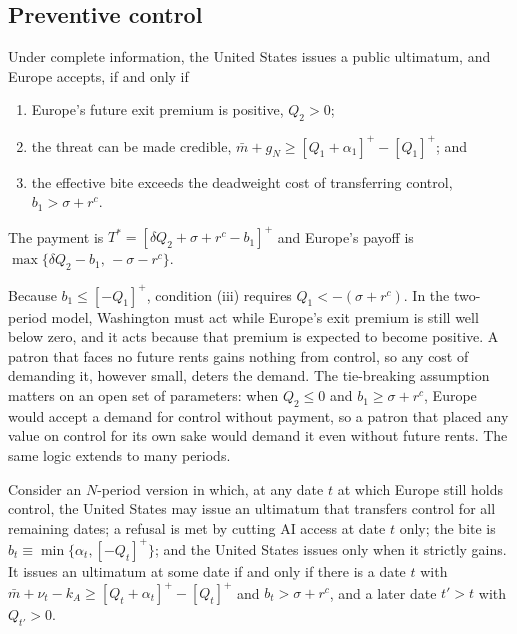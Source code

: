 \subsection{Preventive control}

\begin{proposition}\label{prop:control}
Under complete information, the United States issues a public ultimatum, and Europe accepts, if and only if
\begin{enumerate}[label=(\roman*)]
\item Europe's future exit premium is positive, $Q_2>0$;
\item the threat can be made credible, $\bar m + g_N \geq [Q_1+\alpha_1]^+ - [Q_1]^+$; and
\item the effective bite exceeds the deadweight cost of transferring control, $b_1 > \sigma + r^c$.
\end{enumerate}
The payment is $T^* = [\delta Q_2 + \sigma + r^c - b_1]^+$ and Europe's payoff is $\max\{\delta Q_2 - b_1,\, -\sigma - r^c\}$.
\end{proposition}

Because $b_1 \leq [-Q_1]^+$, condition (iii) requires $Q_1 < -(\sigma + r^c)$. In the two-period model, Washington must act while Europe's exit premium is still well below zero, and it acts because that premium is expected to become positive. A patron that faces no future rents gains nothing from control, so any cost of demanding it, however small, deters the demand. The tie-breaking assumption matters on an open set of parameters: when $Q_2\leq 0$ and $b_1\geq\sigma+r^c$, Europe would accept a demand for control without payment, so a patron that placed any value on control for its own sake would demand it even without future rents. The same logic extends to many periods.

\begin{corollary}[Windows]\label{cor:windows}
Consider an $N$-period version in which, at any date $t$ at which Europe still holds control, the United States may issue an ultimatum that transfers control for all remaining dates; a refusal is met by cutting AI access at date $t$ only; the bite is $b_t \equiv \min\{\alpha_t, [-Q_t]^+\}$; and the United States issues only when it strictly gains. It issues an ultimatum at some date if and only if there is a date $t$ with $\bar m + \nu_t - k_A \geq [Q_t+\alpha_t]^+-[Q_t]^+$ and $b_t>\sigma+r^c$, and a later date $t'>t$ with $Q_{t'}>0$.
\end{corollary}

